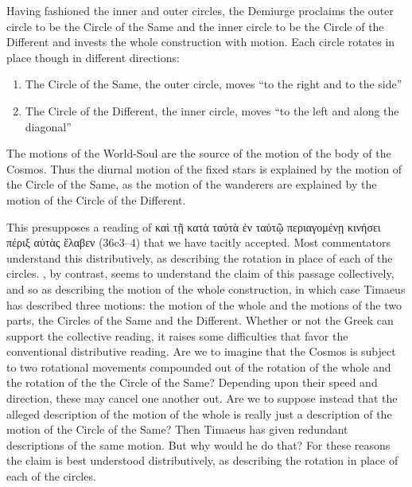 Having fashioned the inner and outer circles, the Demiurge proclaims the outer circle to be the Circle of the Same and the inner circle to be the Circle of the Different and invests the whole construction with motion. Each circle rotates in place though in different directions:
\begin{enumerate}[(1)]
	\item The Circle of the Same, the outer circle, moves ``to the right and to the side''
	\item The Circle of the Different, the inner circle, moves ``to the left and along the diagonal''
\end{enumerate}
The motions of the World-Soul are the source of the motion of the body of the Cosmos. Thus the diurnal motion of the fixed stars is explained by the motion of the Circle of the Same, as the motion of the wanderers are explained by the motion of the Circle of the Different.

This presupposes a reading of {\sbl καὶ τῇ κατὰ ταὐτὰ ἐν ταὐτῷ περιαγομένῃ κινήσει πέριξ αὐτὰς ἔλαβεν} (36c3--4) that we have tacitly accepted. Most commentators understand this distributively, as describing the rotation in place of each of the circles. \citet[112 n2]{Archer-Hind:1888qd}, by contrast, seems to understand the claim of this passage collectively, and so as describing the motion of the whole construction, in which case Timaeus has described three motions: the motion of the whole and the motions of the two parts, the Circles of the Same and the Different. Whether or not the Greek can support the collective reading, it raises some difficulties that favor the conventional distributive reading. Are we to imagine that the Cosmos is subject to two rotational movements compounded out of the rotation of the whole and the rotation of the the Circle of the Same? Depending upon their speed and direction, these may cancel one another out. Are we to suppose instead that the alleged description of the motion of the whole is really just a description of the motion of the Circle of the Same? Then Timaeus has given redundant descriptions of the same motion. But why would he do that? For these reasons the claim is best understood distributively, as describing the rotation in place of each of the circles.

